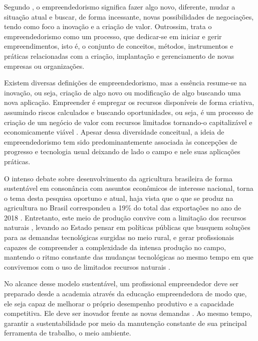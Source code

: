 Segundo , o empreendedorismo significa fazer algo novo, diferente, mudar a situação atual e buscar, de forma incessante, novas possibilidades de negociações, tendo como foco a inovação e a criação de valor. Outrossim,  trata o empreendedorismo como um processo, que dedicar-se em iniciar e gerir empreendimentos, isto é, o conjunto de conceitos, métodos, instrumentos e práticas relacionadas com a criação, implantação e gerenciamento de novas empresas ou organizações.

Existem diversas definições de empreendedorismo, mas a essência resume-se na inovação, ou seja, criação de algo novo ou modificação de algo buscando uma nova aplicação. Empreender é empregar os recursos disponíveis de forma criativa, assumindo riscos calculados e buscando oportunidades, ou seja, é um processo de criação de um negócio de valor com recursos limitados tornando-o capitalizável e economicamente viável \cite{costa_empreendedorismo_2006, lopes_educacao_2010}. Apesar dessa diversidade conceitual, a ideia de empreendedorismo tem sido predominantemente associada às concepções de progresso e tecnologia usual deixando de lado o campo e nele suas aplicações práticas.
 
O intenso debate sobre desenvolvimento da agricultura brasileira de forma sustentável em consonância com assuntos econômicos de interesse nacional, torna o tema desta pesquisa oportuno e atual, haja vista que o que se produz na agricultura no Brasil correspondeu a 19\% do total das exportações no ano de 2018 \cite{mdic_comex_2019}. Entretanto, este meio de produção convive com a limitação dos recursos naturais \cite{jacobi_meio_1999}, levando ao Estado pensar em políticas públicas que busquem soluções para as demandas tecnológicas surgidas no meio rural, e gerar profissionais capazes de compreender a complexidade da intensa produção no campo, mantendo o ritmo constante das mudanças tecnológicas ao mesmo tempo em que convivemos com o uso de limitados recursos naturais  \cite{costa_dinamica_2016}.

No alcance desse modelo sustentável, um profissional empreendedor deve ser preparado desde a academia através da educação empreendedora de modo que, ele seja capaz de melhorar o próprio desempenho produtivo \cite{da_silva_qualidade_2017} e a capacidade competitiva\cite{hoffmann_brasil_2015}. Ele deve ser inovador frente as novas demandas \cite{morais_empreendedorismo_2018}. Ao mesmo tempo, garantir a sustentabilidade por meio da manutenção constante de sua principal ferramenta de trabalho, o meio ambiente.

